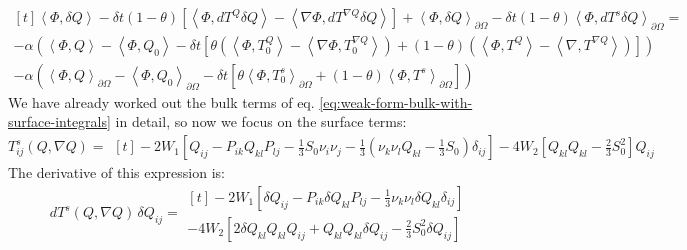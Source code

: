 \documentclass[reqno]{article}
\begin{document}
\begin{equation} \label{eq:weak-form-bulk-with-surface-integrals}
\begin{multlined}[t]
    \left<\Phi, \delta Q\right> 
    - \delta t \left(1 - \theta \right) \left[
        \left<\Phi, dT^Q \delta Q\right> 
        - \left<\nabla \Phi, dT^{\nabla Q} \delta Q \right>
    \right] 
    + \left<\Phi, \delta Q\right>_{\partial \Omega}
    - \delta t \left(1 - \theta \right) \left< \Phi, dT^s \delta Q \right>_{\partial \Omega}
    = \\
    - \alpha \left( 
        \left<\Phi, Q\right> - \left<\Phi, Q_0\right> - \delta t \left[ 
            \theta \left(\left<\Phi, T_0^Q\right> - \left<\nabla \Phi, T_0^{\nabla Q} \right> \right)
            + \left(1 - \theta \right) \left( \left<\Phi, T^Q\right> - \left<\nabla, T^{\nabla Q} \right> \right)
        \right]
    \right) \\
    -
    \alpha \left(
        \left<\Phi, Q\right>_{\partial \Omega} 
            - \left< \Phi, Q_0 \right>_{\partial \Omega} 
            - \delta t \left[ 
                \theta \left<\Phi, T_0^s\right>_{\partial \Omega} 
                + \left(1 - \theta\right) \left< \Phi, T^s \right>_{\partial \Omega} 
            \right] 
    \right)
\end{multlined}
\end{equation}
We have already worked out the bulk terms of eq. \eqref{eq:weak-form-bulk-with-surface-integrals} in detail, so now we focus on the surface terms:
\begin{equation}
    T^s_{ij}(Q, \nabla Q)
    =
    \begin{multlined}[t]
        -2 W_1 \left[
            Q_{ij} 
            - P_{ik} Q_{kl} P_{lj} 
            - \frac13 S_0 \nu_i \nu_j 
            - \frac13 \left( \nu_k \nu_l Q_{kl} - \frac13 S_0 \right) \delta_{ij}
        \right] 
        - 4 W_2 \left[ 
            Q_{kl} Q_{kl}
            - \frac23 S_0^2
        \right] Q_{ij}
    \end{multlined}
\end{equation}
The derivative of this expression is:
\begin{equation}
    dT^s(Q, \nabla Q) \, \delta Q_{ij}
    =
    \begin{multlined}[t]
        -2 W_1 \left[
            \delta Q_{ij} 
            - P_{ik} \delta Q_{kl} P_{lj} 
            - \frac13 \nu_k \nu_l \delta Q_{kl} \delta_{ij}
        \right] \\
        - 4 W_2 \left[ 
            2 \delta Q_{kl} Q_{kl} Q_{ij}
            + Q_{kl} Q_{kl} \delta Q_{ij}
            - \frac23 S_0^2 \delta Q_{ij}
        \right] 
    \end{multlined}
\end{equation}
\end{document}
